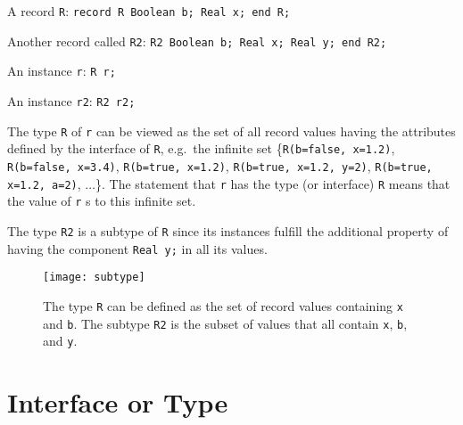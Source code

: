 \begin{example}
A record \lstinline!R!: \lstinline!record R Boolean b; Real x; end R;!

Another record called \lstinline!R2!: \lstinline!R2 Boolean b; Real x; Real y; end R2;!

An instance \lstinline!r!: \lstinline!R r;!

An instance \lstinline!r2!: \lstinline!R2 r2;!

The type \lstinline!R! of \lstinline!r! can be viewed as the set of all record values having the attributes defined by the interface of \lstinline!R!, e.g.\ the infinite set \{\lstinline!R(b=false, x=1.2)!, \lstinline!R(b=false, x=3.4)!, \lstinline!R(b=true, x=1.2)!, \lstinline!R(b=true, x=1.2, y=2)!, \lstinline!R(b=true, x=1.2, a=2)!, $\ldots$\}.
The statement that \lstinline!r! has the type (or interface) \lstinline!R! means that the value of \lstinline!r! s to this infinite set.

The type \lstinline!R2! is a subtype of \lstinline!R! since its instances
fulfill the additional property of having the component \lstinline!Real y;!
in all its values.

\begin{figure}[H]
  \begin{center}
    \texttt{[image: subtype]}
  \end{center}
  \caption{The type \lstinline!R! can be defined as the set of record values containing \lstinline!x! and \lstinline!b!.  The subtype \lstinline!R2! is the subset of values that all contain
  \lstinline!x!, \lstinline!b!, and \lstinline!y!.}
\end{figure}
\end{example}

\section{Interface or Type}\label{interface-or-type}

